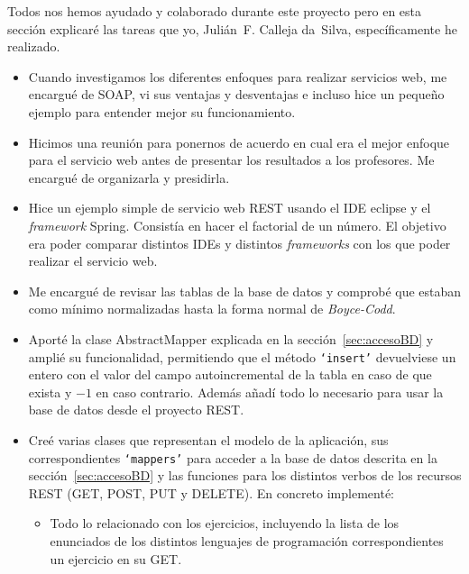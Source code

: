 
Todos nos hemos ayudado y colaborado durante este proyecto pero en esta sección explicaré las tareas que yo, Julián~F. Calleja da~Silva, específicamente he realizado.

\begin{itemize}
\item
Cuando investigamos los diferentes enfoques para realizar servicios web, me encargué de SOAP, vi sus ventajas y desventajas e incluso hice un pequeño ejemplo para entender mejor su funcionamiento.

\item
Hicimos una reunión para ponernos de acuerdo en cual era el mejor enfoque para el servicio web antes de presentar los resultados a los profesores. Me encargué de organizarla y presidirla.

\item
Hice un ejemplo simple de servicio web REST usando el IDE eclipse y el \emph{framework} Spring. Consistía en hacer el factorial de un número. El objetivo era poder comparar distintos IDEs y distintos \emph{frameworks} con los que poder realizar el servicio web.

\item
Me encargué de revisar las tablas de la base de datos y comprobé que estaban como mínimo normalizadas hasta la forma normal de \emph{Boyce-Codd}.

\item
Aporté la clase AbstractMapper explicada en la sección~\ref{sec:accesoBD} y amplié su funcionalidad, permitiendo que el método \texttt{`insert'} devuelviese un entero con el valor del campo autoincremental de la tabla en caso de que exista y $-1$ en caso contrario. Además añadí todo lo necesario para usar la base de datos desde el proyecto REST.

\item
Creé varias clases que representan el modelo de la aplicación, sus correspondientes \texttt{`mappers'} para acceder a la base de datos descrita en la sección~\ref{sec:accesoBD} y las funciones para los distintos verbos de los recursos REST (GET, POST, PUT y DELETE). En concreto implementé:

\begin{itemize}
\item
Todo lo relacionado con los ejercicios, incluyendo la lista de los enunciados de los distintos lenguajes de programación correspondientes un ejercicio en su GET.


\end{itemize}
\end{itemize}
